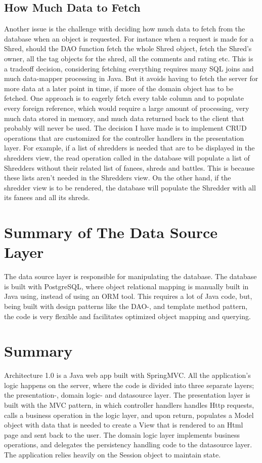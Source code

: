 \subsection{How Much Data to Fetch}
Another issue is the challenge with deciding how much data to fetch from the database when an object is requested. For instance when a request is made for a Shred, should the DAO function fetch the whole Shred object, fetch the Shred's owner, all the tag objects for the shred, all the comments and rating etc. This is a tradeoff decision, considering fetching everything requires many SQL joins and much data-mapper processing in Java. But it avoids having to fetch the server for more data at a later point in time, if more of the domain object has to be fetched. One approach is to eagerly fetch every table column and to populate every foreign reference, which would require a large amount of processing, very much data stored in memory, and much data returned back to the client that probably will never be used. The decision I have made is to implement CRUD operations that are customized for the controller handlers in the presentation layer. For example, if a list of shredders is needed that are to be displayed in the shredders view, the read operation called in the database will populate a list of Shredders without their related list of fanees, shreds and battles. This is because these lists aren't needed in the Shredders view. On the other hand, if the shredder view is to be rendered, the database will populate the Shredder with all its fanees and all its shreds.		

\section{Summary of The Data Source Layer }
The data source layer is responsible for manipulating the database. The database is built with PostgreSQL, where object relational mapping is manually built in Java using, instead of using an ORM tool. This requires a lot of Java code, but, being built with design patterns like the DAO-, and template method pattern, the code is very flexible and facilitates optimized object mapping and querying.      


\section{Summary}
Architecture 1.0 is a Java web app built with SpringMVC. All the application's logic happens on the server, where the code is divided into three separate layers; the presentation-, domain logic- and datasource layer. The presentation layer is built with the MVC pattern, in which controller handlers handles Http requests, calls a business operation in the logic layer, and upon return, populates a Model object with data that is needed to create a View that is rendered to an Html page and sent back to the user. The domain logic layer implements business operations, and delegates the persistency handling code to the datasource layer. The application relies heavily on the Session object to maintain state. 
		
